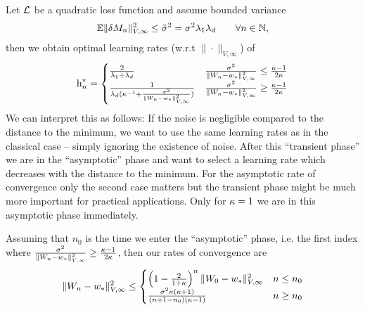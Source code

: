 \begin{theorem}\label{thm: optimal rates quadratic case}
	Let \(\mathcal{L}\) be a quadratic loss function and assume bounded variance
	\begin{align*}
		\mathbb{E}\|\delta M_n\|_{V,\infty}^2
		\le \tilde{\sigma}^2 = \sigma^2 \lambda_1\lambda_d
		\qquad \forall n\in\mathbb{N},
	\end{align*}
	then we obtain optimal learning rates (w.r.t \(\|\cdot\|_{V,\infty}\)) of
	\begin{align*}
		\text{h}_n^*
		= \begin{cases}
			\frac{2}{\lambda_1+\lambda_d}
			& \frac{\sigma^2}{\|W_n - w_*\|_{V,\infty}^2}
			\le \frac{\kappa-1}{2\kappa} \\
			\frac1{\lambda_d(\kappa^{-1} + \frac{\sigma^2}{\|W_n-w_*\|_{V,\infty}^2})}
			& \frac{\sigma^2}{\|W_n - w_*\|_{V,\infty}^2}
			\ge \frac{\kappa-1}{2\kappa}
		\end{cases}
	\end{align*}
	We can interpret this as follows: If the noise is negligible compared to the
	distance to the minimum, we want to use the same learning rates as in the
	classical case -- simply ignoring the existence of noise. After this ``transient
	phase'' we are in the ``asymptotic'' phase and want to select a learning rate
	which decreases with the distance to the minimum. For the asymptotic rate of
	convergence only the second case matters but the transient phase might be much
	more important for practical applications. Only for \(\kappa=1\) we are
	in this asymptotic phase immediately.
	
	Assuming that \(n_0\) is the time we enter the ``asymptotic'' phase,
	i.e. the first index where \(\frac{\sigma^2}{\|W_n -
	w_*\|_{V,\infty}^2} \ge
	\frac{\kappa-1}{2\kappa}\),
	then our rates of convergence are
	\begin{align*}
		\|W_n-w_*\|_{V,\infty}^2
		\le \begin{cases}
			\left(1-\tfrac{2}{1+\kappa}\right)^n\|W_0-w_*\|_{V,\infty}^2
			& n \le n_0\\
			\frac{\sigma^2\kappa(\kappa+1)}{(n+1-n_0)(\kappa-1)}
			& n \ge n_0
		\end{cases}
	\end{align*}
\end{theorem}
